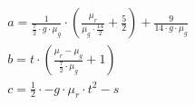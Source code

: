 
\begin{multline}
    a = \frac{1}{\frac{7}{2} \cdot g \cdot \mu_g} \cdot (\frac{\mu_r}{\mu_g \cdot \frac{14}{2}} + \frac{5}{2}) + \frac{9}{14 \cdot g \cdot \mu_g}\\
    b = t \cdot (\frac{\mu_r - \mu_g}{\frac{7}{2} \cdot \mu_g} + 1)\\
    c = \frac{1}{2} \cdot -g \cdot \mu_r \cdot t^2 - s\\
\end{multline}
